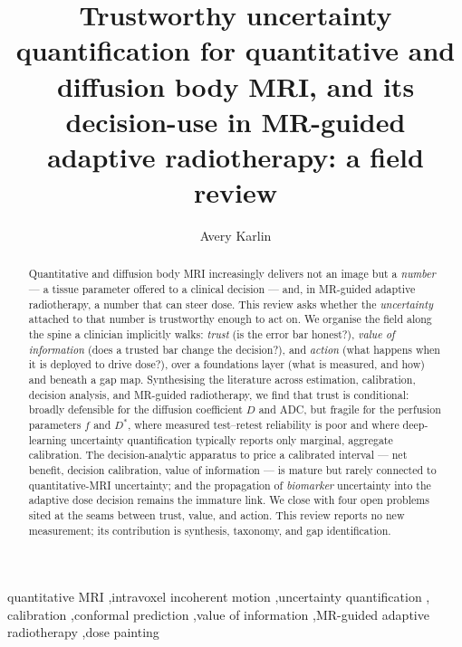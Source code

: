 \documentclass[review,number]{elsarticle}
\newcommand{\Dstar}{D^{*}}
\begin{document}
\begin{frontmatter}

\title{Trustworthy uncertainty quantification for quantitative and diffusion body MRI,
and its decision-use in MR-guided adaptive radiotherapy: a field review}

\author[col,cub,asi]{Avery Karlin}


\begin{abstract}
Quantitative and diffusion body MRI increasingly delivers not an image but a
\emph{number} --- a tissue parameter offered to a clinical decision --- and, in
MR-guided adaptive radiotherapy, a number that can steer dose. This review asks whether
the \emph{uncertainty} attached to that number is trustworthy enough to act on. We
organise the field along the spine a clinician implicitly walks: \emph{trust} (is the
error bar honest?), \emph{value of information} (does a trusted bar change the
decision?), and \emph{action} (what happens when it is deployed to drive dose?), over a
foundations layer (what is measured, and how) and beneath a gap map. Synthesising the
literature across estimation, calibration, decision analysis, and MR-guided
radiotherapy, we find that trust is conditional: broadly defensible for the diffusion
coefficient $D$ and ADC, but fragile for the perfusion parameters $f$ and $\Dstar$,
where measured test--retest reliability is poor and where deep-learning uncertainty
quantification typically reports only marginal, aggregate calibration. The
decision-analytic apparatus to price a calibrated interval --- net benefit, decision
calibration, value of information --- is mature but rarely connected to
quantitative-MRI uncertainty; and the propagation of \emph{biomarker} uncertainty into
the adaptive dose decision remains the immature link. We close with four open problems
sited at the seams between trust, value, and action. This review reports no new
measurement; its contribution is synthesis, taxonomy, and gap identification.
\end{abstract}

\begin{keyword}
quantitative MRI \sep intravoxel incoherent motion \sep uncertainty quantification \sep
calibration \sep conformal prediction \sep value of information \sep MR-guided adaptive
radiotherapy \sep dose painting
\end{keyword}

\end{frontmatter}
\end{document}
